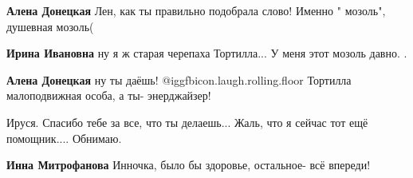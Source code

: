 \begin{itemize}
\begin{itemize} %
\textbf{Алена Донецкая} Лен, как ты правильно подобрала слово! Именно " мозоль", душевная мозоль(

\textbf{Ирина Ивановна} ну я ж старая черепаха Тортилла... У меня этот мозоль давно. .

\textbf{Алена Донецкая} ну ты даёшь! @igg{fbicon.laugh.rolling.floor}  Тортилла малоподвижная особа, а ты- энерджайзер!
\end{itemize} %

Ируся. Спасибо тебе за все, что ты делаешь... Жаль, что я сейчас тот ещё помощник.... Обнимаю.

\textbf{Инна Митрофанова} Инночка, было бы здоровье, остальное- всё впереди!

\end{itemize} %
